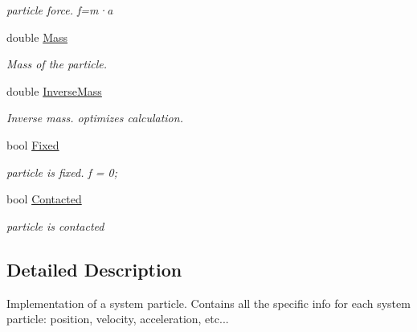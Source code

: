 \begin{DoxyCompactItemize}
\begin{DoxyCompactList}\small\item\em particle force. f=m·a \item\end{DoxyCompactList}\item 
\hypertarget{classvtkParticle_a26466619072cc09762ccd79f0d82ec1e}{
double \hyperlink{classvtkParticle_a26466619072cc09762ccd79f0d82ec1e}{Mass}}
\label{classvtkParticle_a26466619072cc09762ccd79f0d82ec1e}

\begin{DoxyCompactList}\small\item\em Mass of the particle. \item\end{DoxyCompactList}\item 
\hypertarget{classvtkParticle_aec2cae08f2e1b8bb070ece961b995173}{
double \hyperlink{classvtkParticle_aec2cae08f2e1b8bb070ece961b995173}{InverseMass}}
\label{classvtkParticle_aec2cae08f2e1b8bb070ece961b995173}

\begin{DoxyCompactList}\small\item\em Inverse mass. optimizes calculation. \item\end{DoxyCompactList}\item 
\hypertarget{classvtkParticle_a8dc00adfeb24d318664aa04249d2a693}{
bool \hyperlink{classvtkParticle_a8dc00adfeb24d318664aa04249d2a693}{Fixed}}
\label{classvtkParticle_a8dc00adfeb24d318664aa04249d2a693}

\begin{DoxyCompactList}\small\item\em particle is fixed. f = 0; \item\end{DoxyCompactList}\item 
\hypertarget{classvtkParticle_ae89018f12b9eadedf5a1e7a55af0b922}{
bool \hyperlink{classvtkParticle_ae89018f12b9eadedf5a1e7a55af0b922}{Contacted}}
\label{classvtkParticle_ae89018f12b9eadedf5a1e7a55af0b922}

\begin{DoxyCompactList}\small\item\em particle is contacted \item\end{DoxyCompactList}\end{DoxyCompactItemize}


\subsection{Detailed Description}
Implementation of a system particle. Contains all the specific info for each system particle: position, velocity, acceleration, etc... 

